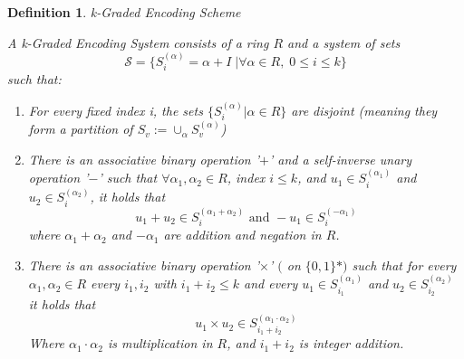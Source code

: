 \documentclass[12pt,twoside]{reedthesis}
\newtheorem{definition}{Definition}
\begin{document}
    \begin{definition}{k-Graded Encoding Scheme}
    \par A k-Graded Encoding System consists of a ring $R$ and a system of sets $$\mathcal{S}= \{S_i^{(\alpha)} = \alpha + I \; | \forall \alpha \in R, \; 0 \leq i \leq k \}$$ such that:
    \begin{enumerate}
    \item For every fixed index i, the sets $\{S_i^{(\alpha)}| \alpha \in R \}$ are disjoint (meaning they form a partition of $S_v := \cup_\alpha S_v^{(\alpha)}$)
    
    \item There is an associative binary operation '$ + $' and a self-inverse unary operation '$-$' such that $\forall \alpha_1,\alpha_2 \in R$, index $i\leq k$, and $u_1 \in S_i^{(\alpha_1)}$ and $u_2 \in S_i^{(\alpha_2)}$, it holds that 
    $$u_1 + u_2 \in S_i^{(\alpha_1 + \alpha_2)} \text{ and } -u_1 \in S_i^{(-\alpha_1)}$$
    where $\alpha_1 + \alpha_2$ and $-\alpha_1$ are addition and negation in $R$.
    
    \item There is an associative binary operation '$\times$' $($ on $\{ 0,1 \}*)$ such that for every $\alpha_1,\alpha_2 \in R$ every $i_1,i_2$ with $i_1+i_2 \leq k$ and every $u_1 \in S_{i_1}^{(\alpha_1)}$ and $u_2 \in S_{i_2}^{(\alpha_2)}$ it holds that 
    $$u_1 \times u_2 \in S_{i_1 + i_2}^{(\alpha_1 \cdot \alpha_2)} $$
    Where $\alpha_1 \cdot \alpha_2$ is multiplication in $R$, and $i_1 + i_2$ is integer addition.
    \end{enumerate}
    \end{definition}

    
 
  
    
     
         
    
\end{document}

